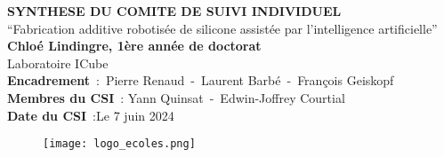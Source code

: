 \documentclass[11pt,a4paper]{article}
\begin{document}
\pagestyle{empty}

\newcommand\titleofdoc{\bfseries SYNTHESE DU COMITE DE SUIVI INDIVIDUEL}
        
    \begin{titlepage}

       \begin{center}
            \vspace*{1.5cm} %
            \Huge{\titleofdoc} \\
            \vspace{4cm}
            \Huge{``Fabrication additive robotisée de silicone assistée par l'intelligence artificielle''}\\
            \vspace{0.8 cm}
            \LARGE{\textbf{Chloé Lindingre, 1ère année de doctorat}}\\
            
            \vspace{0.5 cm}
            \LARGE{Laboratoire ICube} \\
            \vspace{5.5 cm}
            \Large{\textbf{Encadrement}~:~Pierre Renaud~-~Laurent Barbé~-~François Geiskopf} \\
            \vspace{0.5 cm}
            \Large{\textbf{Membres du CSI}~: Yann Quinsat~-~Edwin-Joffrey Courtial} \\
            
            
            \vspace{0.5 cm}
            \Large{\textbf{Date du CSI}~:}Le 7 juin 2024
            \begin{figure}[b]
                \centering
                \texttt{[image: logo\_ecoles.png]}
            \end{figure}
        \end{center}
    \setcounter{page}{0}
    \end{titlepage}
\restoregeometry\newpage
\setcounter{page}{1}
\pagestyle{plain}


\end{document}
